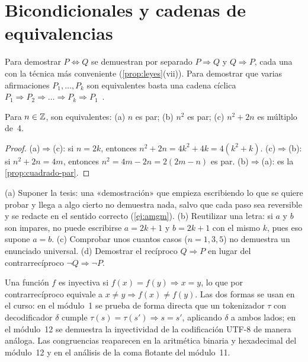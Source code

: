 \section{Bicondicionales y cadenas de equivalencias}

\begin{definicion}
Para demostrar $P\Leftrightarrow Q$ se demuestran por separado $P\Rightarrow Q$ y $Q\Rightarrow P$, cada una con la técnica más conveniente (\cref{prop:leyes}(vii)). Para demostrar que varias afirmaciones $P_1,\dots,P_k$ son equivalentes basta una cadena cíclica $P_1\Rightarrow P_2\Rightarrow\dots\Rightarrow P_k\Rightarrow P_1$~\cite[§7.2]{hammack}.
\end{definicion}

\begin{proposicion}\label{prop:par-equiv}
Para $n\in\mathbb{Z}$, son equivalentes: (a) $n$ es par; (b) $n^{2}$ es par; (c) $n^{2}+2n$ es múltiplo de~4.
\end{proposicion}

\begin{proof}
(a)$\Rightarrow$(c): si $n=2k$, entonces $n^{2}+2n=4k^{2}+4k=4(k^{2}+k)$.
(c)$\Rightarrow$(b): si $n^{2}+2n=4m$, entonces $n^{2}=4m-2n=2(2m-n)$ es par.
(b)$\Rightarrow$(a): es la \cref{prop:cuadrado-par}.
\end{proof}

\begin{observacion}\label{obs:3-errores}
(a) Suponer la tesis: una «demostración» que empieza escribiendo lo que se quiere probar y llega a algo cierto no demuestra nada, salvo que cada paso sea reversible y se redacte en el sentido correcto (\cref{ej:amgm}).
(b) Reutilizar una letra: si $a$ y $b$ son impares, no puede escribirse $a=2k+1$ y $b=2k+1$ con el mismo $k$, pues eso supone $a=b$.
(c) Comprobar unos cuantos casos ($n=1,3,5$) no demuestra un enunciado universal.
(d) Demostrar el recíproco $Q\Rightarrow P$ en lugar del contrarrecíproco $\neg Q\Rightarrow\neg P$.
\end{observacion}

\begin{observacion}
Una función $f$ es inyectiva si $f(x)=f(y)\Rightarrow x=y$, lo que por contrarrecíproco equivale a $x\neq y\Rightarrow f(x)\neq f(y)$. Las dos formas se usan en el curso: en el módulo~1 se prueba de forma directa que un tokenizador $\tau$ con decodificador $\delta$ cumple $\tau(s)=\tau(s')\Rightarrow s=s'$, aplicando $\delta$ a ambos lados; en el módulo~12 se demuestra la inyectividad de la codificación UTF-8 de manera análoga. Las congruencias reaparecen en la aritmética binaria y hexadecimal del módulo~12 y en el análisis de la coma flotante del módulo~11.
\end{observacion}

